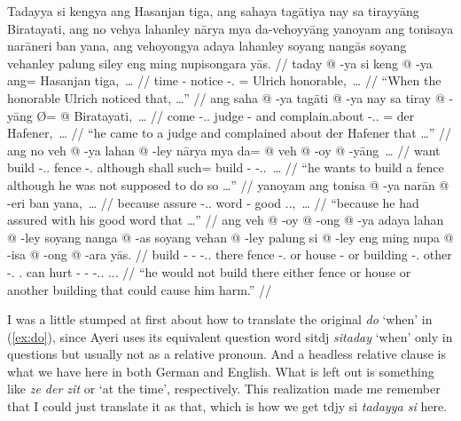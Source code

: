 \documentclass[12pt,paper=a4]{scrartcl}
\newcommand{\fw}[1]{\textit{#1}} %
\newcommand{\ayr}[1]{{\Tagati #1}}
\newcommand{\xayr}[3]{{\Tagati #1} \emph{#2} \enquote*{#3}}
\begin{document}

\pex%
	\glpreamble Tadayya si kengya ang Hasanjan tiga, ang sahaya tagātiya
		nay sa tirayyāng Biratayati, ang no vehya lahanley nārya mya
		da-vehoyyāng yanoyam ang tonisaya narāneri ban yana, ang 
		vehoyongya adaya lahanley soyang nangās soyang vehanley palung 
		siley eng ming nupisongara yās. //
	\a \label{ex:do} \begingl
		\gla taday @ -ya si keng @ -ya ang= Hasanjan tiga,~… //
		\glb time -\Loc{} \Rel{} notice -\Tsg{}.\M{} \Aarg{}= Ulrich 
			honorable,~… //
		\glft \enquote{When the honorable Ulrich noticed that, …} //
	\endgl
	\a \begingl
		\gla ang saha @ -ya tagāti @ -ya nay sa tiray @ -yāng Ø= @ 
			{Biratayati},~… //
		\glb \AgtT{} come -\Tsg{}.\M{}.\Top{} judge -\Loc{} and \PatT{} 
			complain.about -\Tsg{}.\M{}.\Aarg{} \Top{}= {der 
			Hafener,}~… //
		\glft \enquote{he came to a judge and complained about der 
			Hafener that …} //
	\endgl
	\a \begingl
		\gla ang no veh @ -ya lahan @ -ley nārya mya da= @ veh @ -oy @ 
			-yāng~… //
		\glb \AgtT{} want build -\Tsg{}.\M{}.\Top{} fence 
			-\Parg{}.\Inan{} although shall such= build 
			-\Neg{} -\Tsg{}.\M{}.\Aarg{}~… //
		\glft \enquote{he wants to build a fence although he was not 
			supposed to do so …} //
	\endgl
	\a \begingl
		\gla yanoyam ang tonisa @ -ya narān @ -eri ban yana,~… //
		\glb because \AgtT{} assure -\Tsg{}.\M{}.\Top{} word -\Ins{} 
			good \Tsg{}.\M{}.\Gen{},~… //
		\glft \enquote{because he had assured with his good word that 
			…} //
	\endgl
	\a \begingl
		\gla ang veh @ -oy @ -ong @ -ya adaya lahan @ -ley soyang nanga 
			@ -as soyang vehan @ -ley palung si @ -ley eng ming nupa 
			@ -isa @ -ong @ -ara yās. //
		\glb \AgtT{} build -\Neg{} -\Irr{} -\Tsg{}.\M{}.\Top{} there 
			fence -\Parg{}.\Inan{} or house -\Parg{} or building 
			-\Parg{}.\Inan{} other \Rel{} -\Parg{}.\Inan{} 
			\AgtT{}.\Inan{} can hurt -\Caus{} -\Irr{} 
			-\Tsg{}.\Inan{}.\Top{} \Tsg{}.\M{}.\Parg{}. //
		\glft \enquote{he would not build there either fence or house or 
			another building that could cause him harm.} //
	\endgl
\xe

I was a little stumped at first about how to translate the original \fw{do} 
`when' in (\ref{ex:do}), since Ayeri uses its equivalent question word 
\xayr{sitdj}{sitaday}{when} only in questions but usually not as a relative 
pronoun. And a headless relative clause is what we have here in both German and 
English. What is left out is something like \fw{ze der zît} or `at the time', 
respectively. This realization made me remember that I could just translate it 
as that, which is how we get \ayr{tdjy si} \fw{tadayya si} here.
\end{document}
